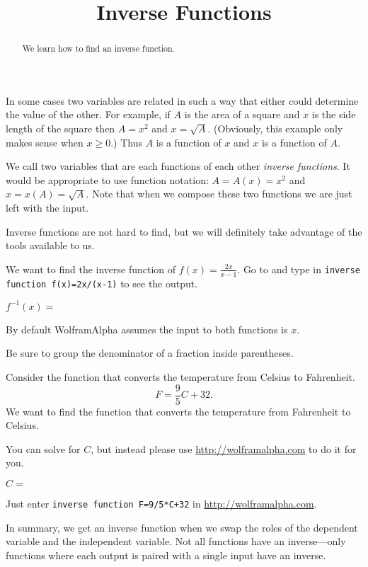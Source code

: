 \documentclass{ximera}
\title{Inverse Functions}
\begin{document}
\begin{abstract}
We learn how to find an inverse function.
\end{abstract}
\maketitle

In some cases two variables are related in such a way that either could determine the value of the other. For example, if $A$ is the area of a square and $x$ is the side length of the square then $A=x^2$ and $x=\sqrt{A}$. (Obviously, this example only makes sense when $x\geq 0$.) Thus $A$ is a function of $x$ and $x$ is a function of $A$.

We call two variables that are each functions of each other \emph{inverse functions}. It would be appropriate to use function notation: $A=A(x)=x^2$ and $x=x(A)=\sqrt{A}$. Note that when we compose these two functions we are just left with the input. 

Inverse functions are not hard to find, but we will definitely take advantage of the tools available to us. 

\begin{question}
We want to find the inverse function of $f(x)=\frac{2x}{x-1}$.
Go to  and type in \verb|inverse function f(x)=2x/(x-1)| to see the output.

$f^{-1}(x)=$ 
\begin{hint}
By default WolframAlpha assumes the input to both functions is $x$.
\end{hint}
\begin{hint}
Be sure to group the denominator of a fraction inside parentheses.
\end{hint}

\end{question}



\begin{question}
Consider the function that converts the temperature from Celsius to Fahrenheit. 
\[
F=\frac{9}{5}C+32.
\]
We want to find the function that converts the temperature from Fahrenheit to Celsius.

You can solve for $C$, but instead please use \href{http://wolframalpha.com}{http://wolframalpha.com} to do it for you.


$C=$ 
\begin{hint}
Just enter \verb|inverse function F=9/5*C+32| in \href{http://wolframalpha.com}{http://wolframalpha.com}.
\end{hint}


In summary, we get an inverse function when we swap the roles of the dependent variable and the independent variable. Not all functions have an inverse---only functions where each output is paired with a single input have an inverse.
\end{question}
\end{document}
